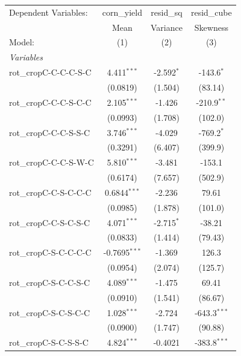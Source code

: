
\begingroup
\centering
\begin{tabular}{lccc}
   \tabularnewline \midrule \midrule
   Dependent Variables:  & corn\_yield     & resid\_sq    & resid\_cube\\   
                         & Mean            & Variance     & Skewness \\   
   Model:                & (1)             & (2)          & (3)\\  
   \midrule
   \emph{Variables}\\
   rot\_cropC-C-C-C-S-C  & 4.411$^{***}$   & -2.592$^{*}$ & -143.6$^{*}$\\   
                         & (0.0819)        & (1.504)      & (83.14)\\   
   rot\_cropC-C-C-S-C-C  & 2.105$^{***}$   & -1.426       & -210.9$^{**}$\\   
                         & (0.0993)        & (1.708)      & (102.0)\\   
   rot\_cropC-C-C-S-S-C  & 3.746$^{***}$   & -4.029       & -769.2$^{*}$\\   
                         & (0.3291)        & (6.407)      & (399.9)\\   
   rot\_cropC-C-C-S-W-C  & 5.810$^{***}$   & -3.481       & -153.1\\   
                         & (0.6174)        & (7.657)      & (502.9)\\   
   rot\_cropC-C-S-C-C-C  & 0.6844$^{***}$  & -2.236       & 79.61\\   
                         & (0.0985)        & (1.878)      & (101.0)\\   
   rot\_cropC-C-S-C-S-C  & 4.071$^{***}$   & -2.715$^{*}$ & -38.21\\   
                         & (0.0833)        & (1.414)      & (79.43)\\   
   rot\_cropC-S-C-C-C-C  & -0.7695$^{***}$ & -1.369       & 126.3\\   
                         & (0.0954)        & (2.074)      & (125.7)\\   
   rot\_cropC-S-C-C-S-C  & 4.089$^{***}$   & -1.475       & 69.41\\   
                         & (0.0910)        & (1.541)      & (86.67)\\   
   rot\_cropC-S-C-S-C-C  & 1.028$^{***}$   & -2.724       & -643.3$^{***}$\\   
                         & (0.0900)        & (1.747)      & (90.88)\\   
   rot\_cropC-S-C-S-S-C  & 4.824$^{***}$   & -0.4021      & -383.8$^{***}$\\   

\end{tabular}
